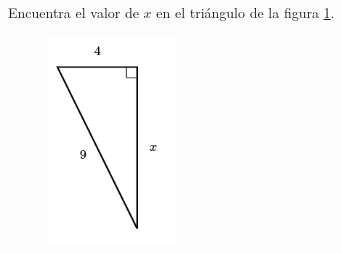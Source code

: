 \question[15]  Encuentra el valor de $x$ en el triángulo de la figura \ref{fig:lados_pitagoras_37}.
\begin{figure}[H]
    \begin{center}
        \includegraphics[width=0.3\textwidth]{../images/lados_pitagoras_37.png}
    \end{center}
    \caption{}
    \label{fig:lados_pitagoras_37}
\end{figure}